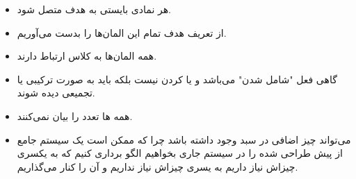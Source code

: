 \begin{itemize}
    \item هر نمادی بایستی به هدف متصل شود.
    \item از تعریف هدف تمام این المان‌ها را بدست می‌آوریم.
    \item همه المان‌ها به کلاس ارتباط دارند.
    \item گاهی فعل "شامل شدن" می‌باشد و  یا  کردن نیست بلکه
    باید به صورت ترکیبی یا تجمیعی دیده شوند.
    \item همه ها تعدد را بیان نمی‌کنند.
    \item می‌تواند چیز اضافی در سبد وجود داشته باشد چرا که ممکن است یک سیستم
    جامع از پیش طراحی شده را در سیستم جاری بخواهیم الگو برداری کنیم که به یکسری
    چیزاش نیاز داریم به یسری چیزاش نیاز نداریم و آن را کنار می‌گذاریم.
\end{itemize}